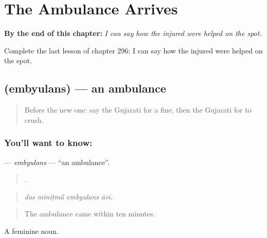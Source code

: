 
\chapter{The Ambulance Arrives}
\label{ch:gu-the-ambulance-arrives}

\begin{chapteropening}
\textbf{By the end of this chapter:} \emph{I can say how the injured were helped on the spot.}

Complete the last lesson of chapter 296: I can say how the injured were helped on the spot.
\end{chapteropening}

\section[\texorpdfstring{\gu{એમ્બ્યુલન્સ} (embyulans)}{એમ્બ્યુલન્સ (embyulans)}]{ (embyulans) — an ambulance}

\label{lesson:GU-C296-embyulans}



\begin{quote}
Before the new one: say the Gujarati for a fine, then the Gujarati for to crush.
\end{quote}

\subsection*{You'll want to know: }
\textbf{} — \emph{embyulans} — \textquotedblleft{}an ambulance\textquotedblright{}.

\begin{quote}
   .
\end{quote}

\begin{quote}
\emph{das miniṭmā̃ embyulans āvī.}
\end{quote}

\begin{quote}
The ambulance came within ten minutes.
\end{quote}

A feminine noun.

